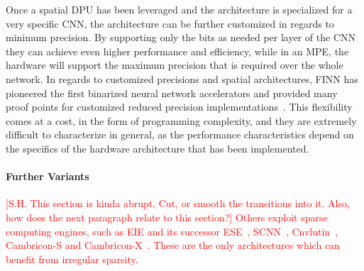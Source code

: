 Once a spatial DPU has been leveraged and the architecture is specialized for a very specific CNN, the architecture can be further customized in regards to minimum precision.  By supporting only the bits as needed per layer of the CNN they can achieve even higher performance and efficiency, while in an MPE, the hardware will support the maximum precision that is required over the whole network. In regards to customized precisions and spatial architectures, FINN has pioneered the first binarized neural network accelerators \cite{umuroglu2017finn,fraser2017scaling} and provided many proof points for customized reduced precision implementations~\cite{blott2018finnr}. 
This flexibility comes at a cost, in the form of programming complexity, and they are extremely difficult to characterize in general, as the performance characteristics depend on the specifics of the hardware architecture that has been implemented.

\paragraph*{Further Variants}
\textcolor{red}{[S.H. This section is kinda abrupt.  Cut, or smooth the transitions into it.  Also, how does the next paragraph relate to this section?]
Others exploit sparse computing engines, such as EIE and its successor ESE~\cite{han2017ese}, SCNN~\cite{parashar2017scnn}, Cnvlutin~\cite{cnvlutin}, Cambricon-S and Cambricon-X~\cite{zhang2016cambricon}. These are the only architectures which can benefit from irregular sparsity.}


